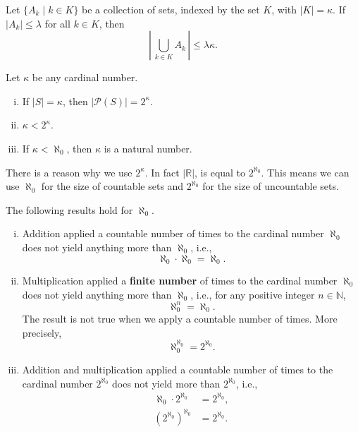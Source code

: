 \begin{theorem} \label{thm-cardinal-union}
	Let $\{A_k \mid k \in K\}$ be a collection of sets, indexed by the set $K$, with $|K| = \kappa$. If $|A_k| \leq \lambda$ for all $k \in K$, then
	\[ \left|\, \bigcup_{k \in K} A_k \, \right| \leq \lambda\kappa. \]
\end{theorem}

\begin{theorem} \label{thm-cardinal-weird}
	Let $\kappa$ be any cardinal number.
	\begin{enumerate}[(i)]
		\item If $|S| = \kappa$, then $|\mathcal{P}(S)| = 2^\kappa$.
		\item $\kappa < 2^\kappa$.
		\item If $\kappa < \aleph_0$, then $\kappa$ is a natural number.
	\end{enumerate}
\end{theorem}
\begin{remark}
	There is a reason why we use $2^\kappa$.
	 In fact $|\mathbb{R}|$, is equal to $2^{\aleph_0}$.  This means we can use $\aleph_0$ for the size of countable sets and $2^{\aleph_0}$ for the size of uncountable sets.
\end{remark}

\begin{theorem} \label{thm-cardinal-aleph_0} The following results hold for $\aleph_0$.
\begin{enumerate}[(i)]
	\item Addition applied a countable number of times to the cardinal number $\aleph_0$ does not yield anything more than $\aleph_0$, i.e., $$\aleph_0 \cdot \aleph_0 = \aleph_0.$$
	\item Multiplication applied a \textbf{finite number} of times to the cardinal number $\aleph_0$ does not yield anything more than $\aleph_0$, i.e., for any positive integer $n\in\mathbb{N}$, $$\aleph_0^n = \aleph_0.$$ 
	The result is not true when we apply a countable number of times. More precisely,
	\begin{equation*}
		\aleph_0^{\aleph_0} = 2^{\aleph_0}.
	\end{equation*}
	\item Addition and multiplication applied a countable number of times to the cardinal number $2^{\aleph_0}$ does not yield more than $2^{\aleph_0}$, i.e., 
	\begin{align*}
		\aleph_0 \cdot 2^{\aleph_0} &= 2^{\aleph_0},
		\\
		(2^{\aleph_0})^{\aleph_0} &= 2^{\aleph_0}.
	\end{align*}
\end{enumerate}
\end{theorem}

